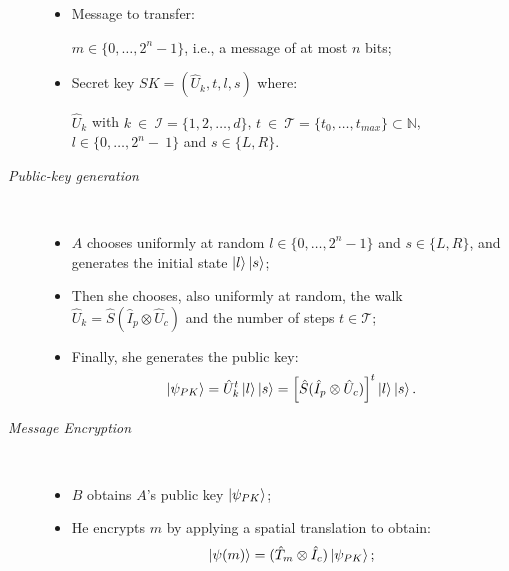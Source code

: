 \begin{protocol}\
\label{prot:pk} 
\begin{description}
\item[\hspace{3mm}{\em Inputs for the protocol}]\
	\begin{itemize}
		\item Message to transfer: 

			$m\in \{0, \dots, 2^n-1 \}$, i.e., a message of at most $n$ bits;

		\item Secret key $SK = (\hat U_k, t, l, s)$ where:

			$\hat{U}_k$ with $k~\in~\mathcal I=\{1,2,\ldots,d\}$, 
			$t~\in~\mathcal{T} = \{ t_0, \dots, t_{max} \} \subset \mathbb{N}$, 
			$l \in \{ 0, \dots, 2^n-~1\} $ and $s \in\{ L,R\}$.
			
	\end{itemize}

\item[\hspace{3mm} {\em Public-key generation}]\
	\begin{itemize}
	\item $A$ chooses uniformly at random $l \in \{0, \dots ,2^n-1 \} $ and 
	$s \in\{ L,R\}$, and generates the initial state $\Ket{l}\Ket{s}$;
	
	\item Then she chooses, also uniformly at random, the walk 
	$\hat{U}_k = \hat{S} (\hat{I}_p \otimes \hat U_{c})$ 
	and the number of steps $t\in\mathcal T$;   
	
	\item Finally, she generates the public key:
	\begin{equation}
	\Ket{\psi_{PK}} 	= \hat{U}_k^t\Ket{l}\Ket{s} 
				= \left[\hat{S} (\hat{I}_p \otimes \hat U_{c})\right]^t \Ket{l}\Ket{s}.
	\end{equation}
	\end{itemize}

\item[\hspace{3mm} {\em Message Encryption}]\
	\begin{itemize}
	
	\item $B$ obtains $A$'s public key $\Ket{\psi_{PK}}$;
	
	\item He encrypts $m$ by applying a spatial translation to obtain: 
		\begin{equation}
		\Ket{\psi(m)} = (\hat{T}_m\otimes \hat{I}_c) \Ket{\psi_{PK}};
		\end{equation} 
		

\end{itemize}
\end{description}
\end{protocol}
